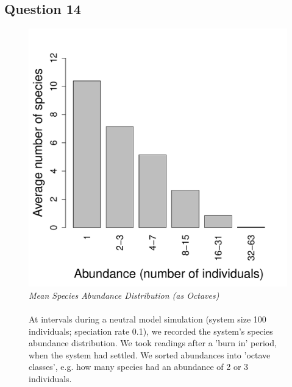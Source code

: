 \documentclass[11pt]{article}
\begin{document}
\newpage

\subsection*{Question 14}
\begin{figure}[h]
\centering
\includegraphics[width=0.5\linewidth]{../Results/Question_14.pdf}
\caption{\emph{Mean Species Abundance Distribution (as Octaves)}\\\\
At intervals during a neutral model simulation (system size 100 individuals; speciation rate 0.1), we recorded the system's species abundance distribution. We took readings after a 'burn in' period, when the system had settled. We sorted abundances into 'octave classes', e.g. how many species had an abundance of 2 or 3 individuals.}
\end{figure}

\newpage

\end{document}
